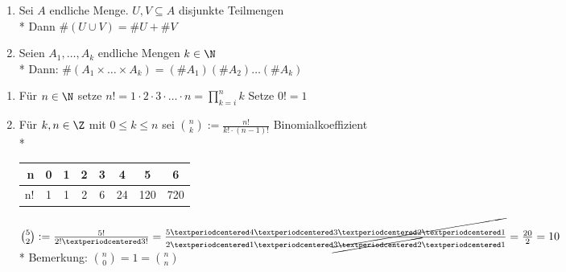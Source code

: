 \begin{enumerate}
\item Sei $A$ endliche Menge. $U,V\subseteq A$ disjunkte Teilmengen\\*
Dann $\#(U\cup V)=\# U + \# V$ 
\item Seien $A_1,…,A_k$ endliche Mengen $k \in \N$\\*
Dann: $\#(A_1 \times … \times A_k)=(\#A_1)(\#A_2)…(\#A_k)$
\end{enumerate}

\begin{enumerate}
\item Für $n\in \N$ setze $n!=1·2·3· … · n=\prod_{k=i}^n k$
Setze $0!=1$
\item Für $k,n\in \Z$ mit $0\le k \le n$ sei $\binom{n}{k}:= \frac{n!}{k!·(n-1)!}$ \Rarr{} Binomialkoeffizient\\*
\begin{tabular}{r|c|c|c|c|c|c|c}
n & 0 & 1 & 2 & 3 & 4 & 5 & 6\\* \hline
n! & 1 & 1 & 2 & 6 & 24 & 120 & 720
\end{tabular}
\bsp
$\binom{5}{2} := \frac{5!}{2!· 3!} = \frac{5· 4 ·\cancel{3 · 2 · 1}}{2· 1· \cancel{3· 2}· 1 } = \frac{20}{2}=10$\\*
Bemerkung: $\binom{n}{0}= 1 = \binom{n}{n}$
\end{enumerate}